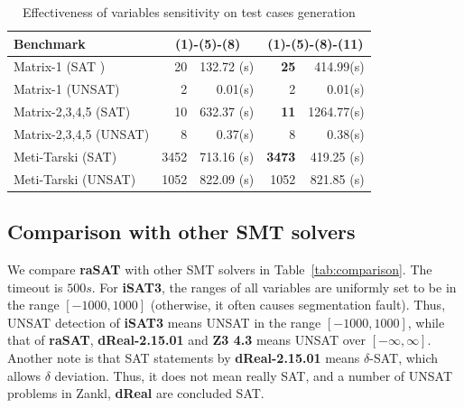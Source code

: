 \documentclass[runningheads,a4paper,oribibl]{llncs}
\begin{document}
\begin{table}
\begin{center}
\begin{tabular}{ | l | r | r | r | r |}
\hline
    \multicolumn{1}{|l|}{Benchmark} & \multicolumn{2}{c|}{(1)-(5)-(8)} &
    \multicolumn{2}{c|}{(1)-(5)-(8)-(11)} \\
\hline
    Matrix-1 (SAT ) & 20 & 132.72 (s) & \textbf{25} & 414.99(s)
\\
\hline
    Matrix-1 (UNSAT) & 2 & 0.01(s) & 2 & 0.01(s)
\\
\hline
	Matrix-2,3,4,5 (SAT) & 10 & 632.37 (s) & \textbf{11} & 1264.77(s)
\\
\hline
    Matrix-2,3,4,5 (UNSAT) & 8 & 0.37(s) & 8 & 0.38(s)
\\ \hline
    Meti-Tarski (SAT) & 3452 & 713.16 (s) & \textbf{3473} & 419.25 (s)
\\
\hline
    Meti-Tarski (UNSAT) & 1052 & 822.09 (s) & 1052 & 821.85 (s)
\\
\hline
\end{tabular}
\end{center}
\caption{Effectiveness of variables sensitivity on test cases generation} 
\label{tab:test-sen}
\end{table}

\subsection{Comparison with other SMT solvers}

We compare {\bf raSAT} with other SMT solvers in Table~\ref{tab:comparison}.
The timeout is $500s$. 
For {\bf iSAT3}, the ranges of all variables are uniformly set to be in the range $[-1000, 1000]$
(otherwise, it often causes segmentation fault). 
Thus, UNSAT detection of {\bf iSAT3} means UNSAT in the range $[-1000, 1000]$, 
while that of {\bf raSAT}, \textbf{dReal-2.15.01} and {\bf Z3 4.3} means UNSAT over $[-\infty, \infty]$.
Another note is that SAT statements by \textbf{dReal-2.15.01} means $\delta$-SAT, which allows
$\delta$ deviation. Thus, it does not mean really SAT, and a number of UNSAT problems in
Zankl, \textbf{dReal} are concluded SAT.
\end{document}
